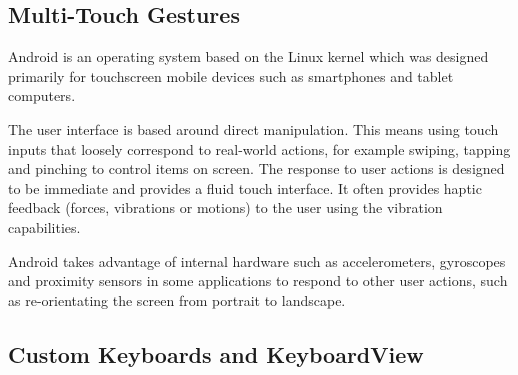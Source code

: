 \documentclass{report}
\begin{document}
\subsection{Multi-Touch Gestures}


Android is an operating system based on the Linux kernel which was designed primarily for touchscreen mobile devices such as smartphones and tablet computers\cite{androidwiki}.

The user interface is based around direct manipulation. This means using touch inputs that loosely correspond to real-world actions, for example swiping, tapping and pinching to control items on screen. The response to user actions is designed to be immediate and provides a fluid touch interface. It often provides haptic feedback (forces, vibrations or motions) to the user using the vibration capabilities.

Android takes advantage of internal hardware such as accelerometers, gyroscopes and proximity sensors in some applications to respond to other user actions, such as re-orientating the screen from portrait to landscape.

\subsection{Custom Keyboards and KeyboardView}

\end{document}
